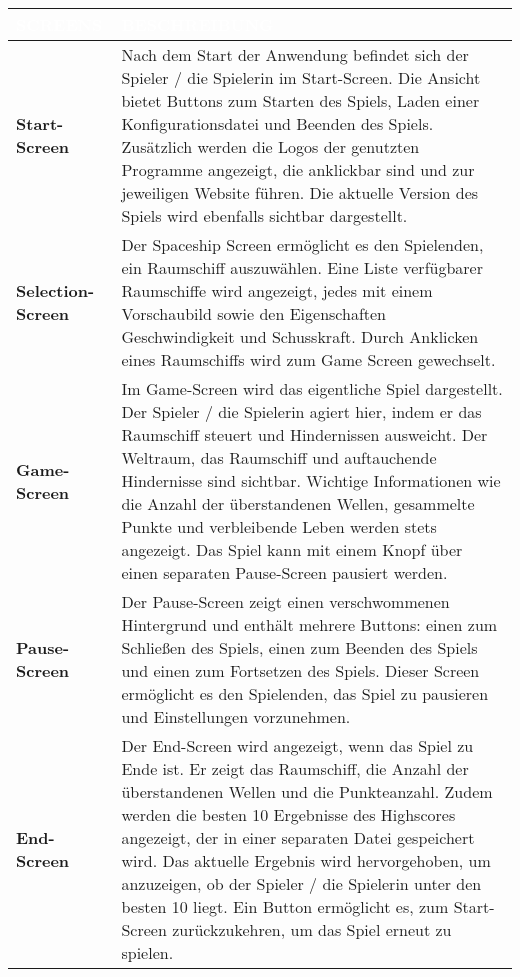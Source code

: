 \documentclass[10pt]{article}
\begin{document}
    \begin{tcolorbox}[
        colframe=unilogo,           %
        colback=unilogo!10,         %
        boxrule=0.5pt,              %
        left=2mm, right=2mm, top=1mm, bottom=1mm, %
        rounded corners=all,        %
    ]
        \begin{tabularx}{\textwidth}{l|X}
            \rowcolor{unilogo} \textbf{\textcolor{white}{SCREENS}} & \textbf{\textcolor{white}{BESCHREIBUNG}} \\
            \hline
            \textbf{Start-Screen} & Nach dem Start der Anwendung befindet sich der Spieler / die Spielerin im Start-Screen. Die Ansicht bietet Buttons zum Starten des Spiels, Laden einer Konfigurationsdatei und Beenden des Spiels. Zusätzlich werden die Logos der genutzten Programme angezeigt, die anklickbar sind und zur jeweiligen Website führen. Die aktuelle Version des Spiels wird ebenfalls sichtbar dargestellt. \\
            \hline
            \textbf{Selection-Screen} & Der Spaceship Screen ermöglicht es den Spielenden, ein Raumschiff auszuwählen. Eine Liste verfügbarer Raumschiffe wird angezeigt, jedes mit einem Vorschaubild sowie den Eigenschaften Geschwindigkeit und Schusskraft. Durch Anklicken eines Raumschiffs wird zum Game Screen gewechselt. \\
            \hline
            \textbf{Game-Screen} & Im Game-Screen wird das eigentliche Spiel dargestellt. Der Spieler / die Spielerin agiert hier, indem er das Raumschiff steuert und Hindernissen ausweicht. Der Weltraum, das Raumschiff und auftauchende Hindernisse sind sichtbar. Wichtige Informationen wie die Anzahl der überstandenen Wellen, gesammelte Punkte und verbleibende Leben werden stets angezeigt. Das Spiel kann mit einem Knopf über einen separaten Pause-Screen pausiert werden. \\ 
            \hline
            \textbf{Pause-Screen} & Der Pause-Screen zeigt einen verschwommenen Hintergrund und enthält mehrere Buttons: einen zum Schließen des Spiels, einen zum Beenden des Spiels und einen zum Fortsetzen des Spiels. Dieser Screen ermöglicht es den Spielenden, das Spiel zu pausieren und Einstellungen vorzunehmen.\\
            \hline
            \textbf{End-Screen} & Der End-Screen wird angezeigt, wenn das Spiel zu Ende ist. Er zeigt das Raumschiff, die Anzahl der überstandenen Wellen und die Punkteanzahl. Zudem werden die besten 10 Ergebnisse des Highscores angezeigt, der in einer separaten Datei gespeichert wird. Das aktuelle Ergebnis wird hervorgehoben, um anzuzeigen, ob der Spieler / die Spielerin unter den besten 10 liegt. Ein Button ermöglicht es, zum Start-Screen zurückzukehren, um das Spiel erneut zu spielen. \\
        \end{tabularx}
    \end{tcolorbox}
    
\end{document}
